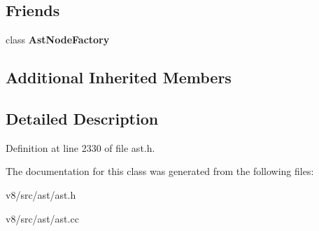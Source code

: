 \subsection*{Friends}
\begin{DoxyCompactItemize}
\item 
\mbox{\label{classv8_1_1internal_1_1FunctionLiteral_a8d587c8ad3515ff6433eb83c578e795f}} 
class {\bfseries Ast\+Node\+Factory}
\end{DoxyCompactItemize}
\subsection*{Additional Inherited Members}


\subsection{Detailed Description}


Definition at line 2330 of file ast.\+h.



The documentation for this class was generated from the following files\+:\begin{DoxyCompactItemize}
\item 
v8/src/ast/ast.\+h\item 
v8/src/ast/ast.\+cc\end{DoxyCompactItemize}
